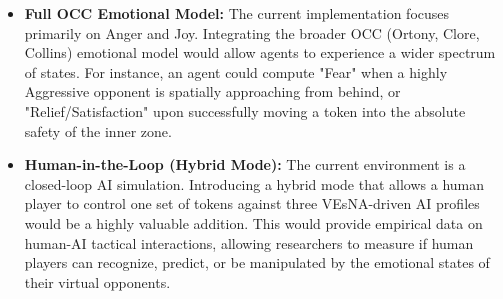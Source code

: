 \documentclass[12pt]{article}
\begin{document}
\begin{itemize}
    \item \textbf{Full OCC Emotional Model:} The current implementation focuses primarily on Anger and Joy. Integrating the broader OCC (Ortony, Clore, Collins) emotional model would allow agents to experience a wider spectrum of states. For instance, an agent could compute "Fear" when a highly Aggressive opponent is spatially approaching from behind, or "Relief/Satisfaction" upon successfully moving a token into the absolute safety of the inner zone.
    \item \textbf{Human-in-the-Loop (Hybrid Mode):} The current environment is a closed-loop AI simulation. Introducing a hybrid mode that allows a human player to control one set of tokens against three VEsNA-driven AI profiles would be a highly valuable addition. This would provide empirical data on human-AI tactical interactions, allowing researchers to measure if human players can recognize, predict, or be manipulated by the emotional states of their virtual opponents.
\end{itemize}

\vspace{1cm}
\nocite{*}


\end{document}
